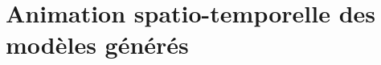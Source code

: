 \chapter[Animation spatio-temporelle des modèles générés]{Animation spatio-temporelle des modèles générés}
\label{cha:spatio-temporel}


